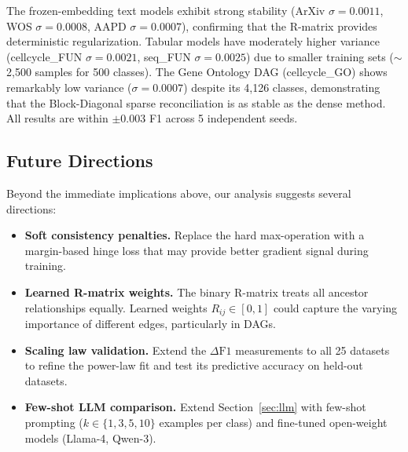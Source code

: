 The frozen-embedding text models exhibit strong stability (ArXiv
$\sigma=0.0011$, WOS $\sigma=0.0008$, AAPD $\sigma=0.0007$),
confirming that the R-matrix provides deterministic regularization.
Tabular models have moderately higher variance (cellcycle\_FUN
$\sigma=0.0021$, seq\_FUN $\sigma=0.0025$) due to smaller training
sets ($\sim$2,500 samples for 500 classes). The Gene Ontology DAG
(cellcycle\_GO) shows remarkably low variance ($\sigma=0.0007$) despite
its 4,126 classes, demonstrating that the Block-Diagonal sparse
reconciliation is as stable as the dense method. All results are within
$\pm 0.003$ F1 across 5 independent seeds.

\subsection{Future Directions}

Beyond the immediate implications above, our analysis suggests several
directions:

\begin{itemize}[leftmargin=*,nosep]
  \item \textbf{Soft consistency penalties.} Replace the hard
    max-operation with a margin-based hinge loss that may provide better
    gradient signal during training.
  \item \textbf{Learned R-matrix weights.} The binary R-matrix treats
    all ancestor relationships equally. Learned weights $R_{ij} \in
    [0,1]$ could capture the varying importance of different edges,
    particularly in DAGs.
  \item \textbf{Scaling law validation.} Extend the $\Delta\text{F1}$
    measurements to all 25 datasets to refine the power-law fit and
    test its predictive accuracy on held-out datasets.
  \item \textbf{Few-shot LLM comparison.} Extend Section~\ref{sec:llm}
    with few-shot prompting ($k \in \{1, 3, 5, 10\}$ examples per class)
    and fine-tuned open-weight models (Llama-4, Qwen-3).
\end{itemize}
